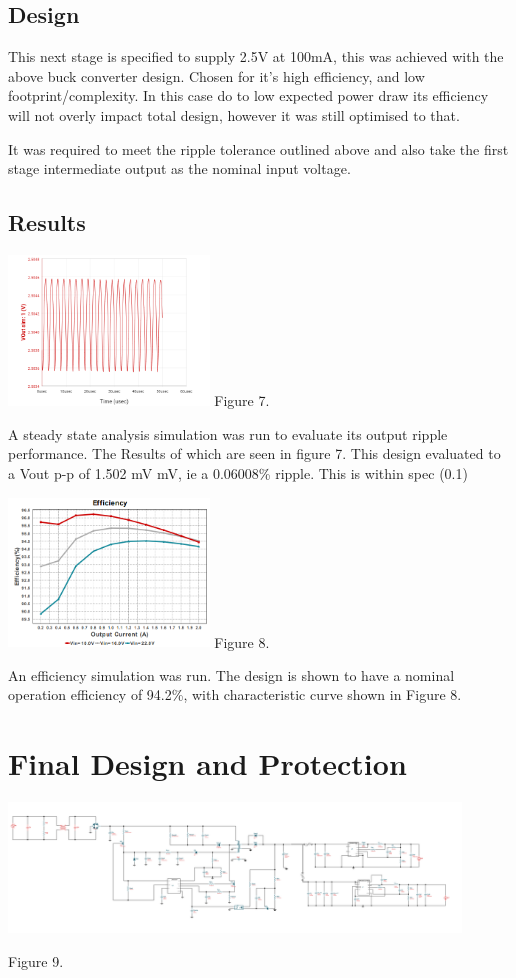 \documentclass[11pt, a4]{article}
\begin{document}
\subsection{Design}
This next stage is specified to supply 2.5V at 100mA, this was achieved with the above buck converter design. Chosen for it's high efficiency, and low footprint/complexity. In this case do to low expected power draw its efficiency will not overly impact total design, however it was still optimised to that.

It was required to meet the ripple tolerance outlined above and also take the first stage intermediate output as the nominal input voltage.
\subsection{Results}

\begin{center}
        \includegraphics[width=0.4\textwidth]{img/2-5-ripple.png}
        Figure 7.
\end{center}
A steady state analysis simulation was run to evaluate its output ripple performance. The Results of which are seen in figure 7.
This design evaluated to a Vout p-p of 1.502 mV mV, ie a 0.06008\% ripple. This is within spec (0.1)
\begin{center}
        \includegraphics[width=0.4\textwidth]{img/2-5V_eff.png}
        Figure 8.
\end{center}
An efficiency simulation was run. The design is shown to have a nominal operation efficiency of 94.2\%, with characteristic curve shown in Figure 8.


\section{Final Design and Protection}
\includegraphics[width=0.9\textwidth]{img/full.png}
\begin{center}
        Figure 9.
\end{center}
\end{document}
